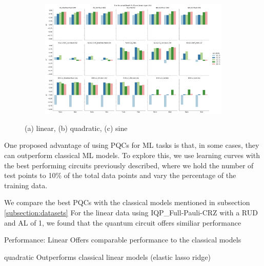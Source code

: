 \documentclass[journal=jacsat,manuscript=article]{achemso}
\begin{document}
\begin{figure}[H]
	\begin{subfigure}[b]{0.49\textwidth}
		\centering
		\includegraphics[width=\linewidth]{../images/Function_Fitting/sixteenqubit/16qubit_Sine_RUD_AL.png}
		\caption{}
		\label{fig:16qubit_Sine_RUD_AL}
	\end{subfigure}	
	\hfill
	\caption{(a) linear, (b) quadratic, (c) sine}
	\label{fig:16qubit_RUD_AL}	
\end{figure}


One proposed advantage of using PQCs for ML tasks is that, in some cases, they can outperform classical ML models.\cite{hatakeyama-sato_quantum_2023}
To explore this, we use learning curves with the best performing circuits previously described, where we hold the number of test points to 10\% of the total data points and vary the percentage of the training data. 

We compare the best PQCs with the classical models mentioned in subsection \ref{subsection:datasets}
For the linear data using IQP\_Full-Pauli-CRZ  with a RUD and AL of 1, we found that the quantum circuit offers similiar performance 

Performance:
Linear
Offers comparable performance to the classical models

quadratic
Outperforms classical linear models (elastic lasso ridge)
\end{document}
